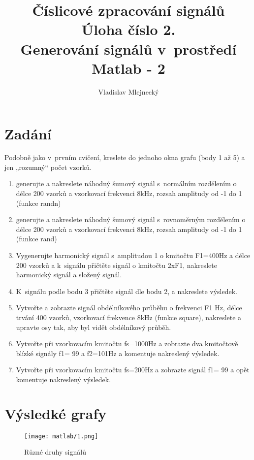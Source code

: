 \documentclass[11pt, a4paper]{article}
\author{Vladislav Mlejnecký}
\title{%
  Číslicové zpracování signálů\\
  \large Úloha číslo 2.\\
  Generování signálů v prostředí Matlab - 2}
\begin{document}
    \maketitle

    \section{Zadání}
    
    Podobně jako v prvním cvičení, kreslete do jednoho okna grafu (body 1 až 5) a jen „rozumný“ počet vzorků.
    \begin{enumerate}
        \item
        generujte a  nakreslete náhodný šumový signál s normálním rozdělením o délce 200 vzorků a vzorkovací frekvenci 8kHz, rozsah amplitudy od -1 do 1 (funkce randn)
        \item
        generujte a  nakreslete náhodný šumový signál s rovnoměrným rozdělením o délce 200 vzorků a vzorkovací frekvenci 8kHz, rozsah amplitudy od -1 do 1 (funkce rand)
        \item
        Vygenerujte  harmonický signál s amplitudou 1 o kmitočtu F1=400Hz a délce 200 vzorků a k signálu přičtěte signál o kmitočtu 2xF1, nakreslete harmonický signál a složený signál.
        \item
        K signálu podle bodu 3 přičtěte signál dle bodu 2, a nakreslete výsledek.
        \item
        Vytvořte a zobrazte signál obdélníkového průběhu o frekvenci F1 Hz, délce trvání 400 vzorků, vzorkovací frekvence 8kHz (funkce square), nakreslete a upravte osy tak, aby byl vidět obdélníkový průběh.
        \item
        Vytvořte při vzorkovacím kmitočtu fs=1000Hz a zobrazte dva kmitočtově blízké signály f1= 99 a f2=101Hz a komentuje nakreslený výsledek.
        \item
        Vytvořte při vzorkovacím kmitočtu fs=200Hz a zobrazte signál f1= 99  a opět komentuje nakreslený výsledek.
    \end{enumerate}
            
    \section{Výsledké grafy}
    
        \begin{figure}[H]
            \centering
            \texttt{[image: matlab/1.png]}
            \caption{Různé druhy signálů}
            \label{fig:graf1}
        \end{figure}
        
\end{document}
